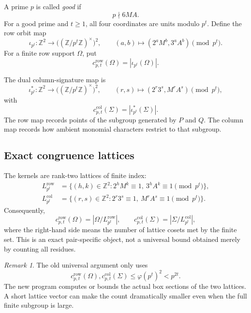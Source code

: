 \documentclass[11pt]{article}
\theoremstyle{definition}
\theoremstyle{remark}
\newtheorem{remark}[theorem]{Remark}
\newcommand{\Z}{\mathbb Z}
\newcommand{\crow}{c^{\mathrm{row}}}
\newcommand{\ccol}{c^{\mathrm{col}}}
\begin{document}
A prime $p$ is called \emph{good} if
\[
p\nmid6MA.
\]
For a good prime and $t\ge1$, all four coordinates are units modulo $p^t$.  Define the row orbit map
\begin{equation}\label{eq:row-map}
\iota_{p^t}:\Z^2\longrightarrow \bigl((\Z/p^t\Z)^\times\bigr)^2,
\qquad
(a,b)\longmapsto (2^aM^b,3^aA^b)\pmod{p^t}.
\end{equation}
For a finite row support $\Omega$, put
\begin{equation}\label{eq:crow}
\crow_{p,t}(\Omega)=|\iota_{p^t}(\Omega)|.
\end{equation}

The dual column-signature map is
\begin{equation}\label{eq:col-map}
\iota^*_{p^t}:\Z^2\longrightarrow \bigl((\Z/p^t\Z)^\times\bigr)^2,
\qquad
(r,s)\longmapsto (2^r3^s,M^rA^s)\pmod{p^t},
\end{equation}
with
\begin{equation}\label{eq:ccol}
\ccol_{p,t}(\Sigma)=|\iota^*_{p^t}(\Sigma)|.
\end{equation}
The row map records points of the subgroup generated by $P$ and $Q$.  The column map records how ambient monomial characters restrict to that subgroup.

\subsection{Exact congruence lattices}

The kernels are rank-two lattices of finite index:
\begin{align}
L^{\mathrm{row}}_{p^t}
&=\{(h,k)\in\Z^2:2^hM^k\equiv1,\ 3^hA^k\equiv1\pmod{p^t}\},\label{eq:row-lattice}\\
L^{\mathrm{col}}_{p^t}
&=\{(r,s)\in\Z^2:2^r3^s\equiv1,\ M^rA^s\equiv1\pmod{p^t}\}.\label{eq:col-lattice}
\end{align}
Consequently,
\begin{equation}\label{eq:box-class-count}
\crow_{p,t}(\Omega)=|\Omega/L^{\mathrm{row}}_{p^t}|,
\qquad
\ccol_{p,t}(\Sigma)=|\Sigma/L^{\mathrm{col}}_{p^t}|,
\end{equation}
where the right-hand side means the number of lattice cosets met by the finite set.  This is an exact pair-specific object, not a universal bound obtained merely by counting all residues.

\begin{remark}
The old universal argument only uses
\[
\crow_{p,t}(\Omega),\ccol_{p,t}(\Sigma)\le\varphi(p^t)^2<p^{2t}.
\]
The new program computes or bounds the actual box sections of the two lattices.  A short lattice vector can make the count dramatically smaller even when the full finite subgroup is large.
\end{remark}
\end{document}

